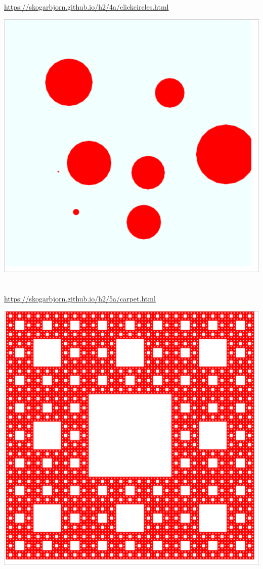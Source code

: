 \documentclass{article}
\begin{document}
	\section{}
	
	\url{https://skogarbjorn.github.io/h2/4a/clickcircles.html}

	\begin{center}
	\includegraphics[scale=0.4]{circles.png}
	\end{center}

	\section{}
	
	\url{https://skogarbjorn.github.io/h2/5a/carpet.html}

	\begin{center}
	\includegraphics[scale=0.45]{carpet.png}
	\end{center}
\end{document}

